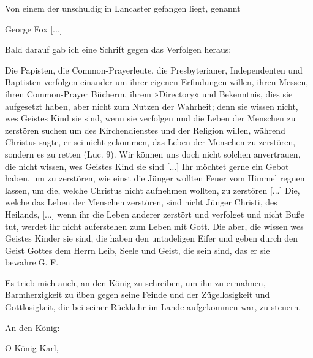 Von einem der unschuldig in Lancaster gefangen liegt, genannt
\begin{center}George Fox [...]\end{center}

Bald darauf gab ich eine Schrift gegen das Verfolgen heraus:

\glqq Die Papisten, die Common-Prayerleute, die Presbyterianer,
Independenten und Baptisten verfolgen einander um ihrer eigenen
Erfindungen willen, ihren Messen, ihren Common-Prayer Bücherm,
ihrem »Directory« und Bekenntnis, dies sie aufgesetzt haben,
aber nicht zum Nutzen der Wahrheit; denn sie wissen nicht, wes
Geistes Kind sie sind, wenn sie verfolgen und die Leben der Menschen
zu zerstören suchen um des Kirchendienstes und der Religion
willen, während Christus sagte, er sei nicht gekommen, das
Leben der Menschen zu zerstören, sondern es zu retten (Luc. 9).
Wir können uns doch nicht solchen anvertrauen, die nicht wissen,
wes Geistes Kind sie sind [...] Ihr möchtet gerne ein Gebot
haben, um zu zerstören, wie einst die Jünger wollten Feuer vom
Himmel regnen lassen, um die, welche Christus nicht aufnehmen
wollten, zu zerstören [...] Die, welche das Leben der Menschen
zerstören, sind nicht Jünger Christi, des Heilands, [...] wenn ihr
die Leben anderer zerstört und verfolget und nicht Buße tut, werdet
ihr nicht auferstehen zum Leben mit Gott. Die aber, die wissen
wes Geistes Kinder sie sind, die haben den untadeligen Eifer und
geben durch den Geist Gottes dem Herrn Leib, Seele und Geist,
die sein sind, das er sie bewahre.\grqq [...] G. F.

Es trieb mich auch, an den König zu schreiben, um ihn zu
ermahnen, Barmherzigkeit zu üben gegen seine Feinde und der
Zügellosigkeit und Gottlosigkeit, die bei seiner Rückkehr im Lande
aufgekommen war, zu steuern.

\begin{center}An den König:\end{center}

\glqq O König Karl,

